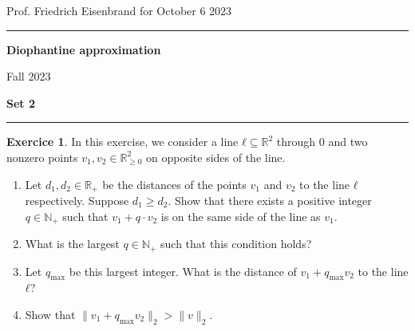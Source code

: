 \documentclass[12pt,a4paper]{article}
\date{}
\theoremstyle{plain}
\newtheorem*{Sol*}{Solution}
\theoremstyle{definition}
\newtheorem{Ex}{Exercice}
\newif\ifsolutions
\newcommand{\exercise}[2]{
			\begin{Ex} #1 \end{Ex}
			\ifsolutions  \begin{Sol*} #2 \end{Sol*} \bigskip \else \bigskip  \fi
		}
\begin{document}
\begin{center}
{Prof. Friedrich Eisenbrand \hfill for October 6 2023}
\end{center}
	
\hrule\vspace{\baselineskip}

\begin{center}
\textbf{ Diophantine approximation}

Fall 2023

\bigskip

\textbf{Set 2}
\ifsolutions{\textbf{- Solutions}} \else{} \fi
\end{center}

\hrule\vspace{\baselineskip}



\exercise{
  In this exercise, we consider a line $ℓ ⊆ ℝ^2$ through $0$ and two nonzero points $v_1, v_2 ∈ ℝ_{≥0}^2$ on opposite sides of the line. 
  \begin{enumerate}
  \item Let $d_1,d_2 ∈ ℝ_+$ be the distances of the points $v_1$ and $v_2$ to the line $ℓ$ respectively. Suppose $d_1 ≥ d_2$. Show that there exists a positive integer $q ∈ℕ_+$ such that $v_1 + q ⋅v_2$ is on the same side of the line as $v_1$.
  \item What is the largest $q ∈ ℕ_+$ such that this condition holds?
  \item Let $q_{\max}$ be this largest integer. What is the distance of $v_1 + q_{\max}v_2$ to the line $ℓ$?
    \item Show that $\| v_1 + q_{\max}v_2\|_2 > \|v\|_2$. 
  \end{enumerate}
  
}{}
\end{document}
